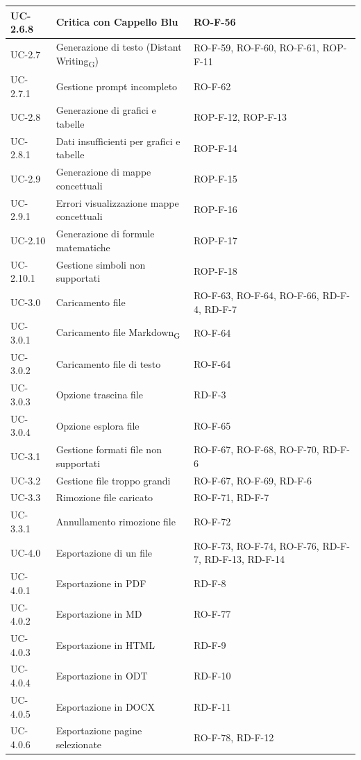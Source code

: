 \documentclass[11pt,a4paper]{article}
\newcommand{\gls}[1]{#1\textsubscript{G}}
\begin{document}
\begin{longtable}{|p{}|p{}|>{\raggedright\arraybackslash}p{}|}
\hline
UC-2.6.8 & Critica con Cappello Blu & RO-F-56 \\
\hline
UC-2.7 & Generazione di testo (\gls{Distant Writing}) & RO-F-59, RO-F-60, RO-F-61, ROP-F-11 \\
\hline
UC-2.7.1 & Gestione prompt incompleto & RO-F-62 \\
\hline
UC-2.8 & Generazione di grafici e tabelle & ROP-F-12, ROP-F-13 \\
\hline
UC-2.8.1 & Dati insufficienti per grafici e tabelle & ROP-F-14 \\
\hline
UC-2.9 & Generazione di mappe concettuali & ROP-F-15 \\
\hline
UC-2.9.1 & Errori visualizzazione mappe concettuali & ROP-F-16 \\
\hline
UC-2.10 & Generazione di formule matematiche & ROP-F-17 \\
\hline
UC-2.10.1 & Gestione simboli non supportati & ROP-F-18 \\
\hline
UC-3.0 & Caricamento file & RO-F-63, RO-F-64, RO-F-66, RD-F-4, RD-F-7 \\
\hline
UC-3.0.1 & Caricamento file \gls{Markdown} & RO-F-64 \\
\hline
UC-3.0.2 & Caricamento file di testo & RO-F-64 \\
\hline
UC-3.0.3 & Opzione trascina file & RD-F-3 \\
\hline
UC-3.0.4 & Opzione esplora file & RO-F-65 \\
\hline
UC-3.1 & Gestione formati file non supportati & RO-F-67, RO-F-68, RO-F-70, RD-F-6 \\
\hline
UC-3.2 & Gestione file troppo grandi & RO-F-67, RO-F-69, RD-F-6 \\
\hline
UC-3.3 & Rimozione file caricato & RO-F-71, RD-F-7 \\
\hline
UC-3.3.1 & Annullamento rimozione file & RO-F-72 \\
\hline
UC-4.0 & Esportazione di un file & RO-F-73, RO-F-74, RO-F-76, RD-F-7, RD-F-13, RD-F-14 \\
\hline
UC-4.0.1 & Esportazione in PDF & RD-F-8 \\
\hline
UC-4.0.2 & Esportazione in MD & RO-F-77 \\
\hline
UC-4.0.3 & Esportazione in HTML & RD-F-9 \\
\hline
UC-4.0.4 & Esportazione in ODT & RD-F-10 \\
\hline
UC-4.0.5 & Esportazione in DOCX & RD-F-11 \\
\hline
UC-4.0.6 & Esportazione pagine selezionate & RO-F-78, RD-F-12 \\

\end{longtable}
\end{document}
